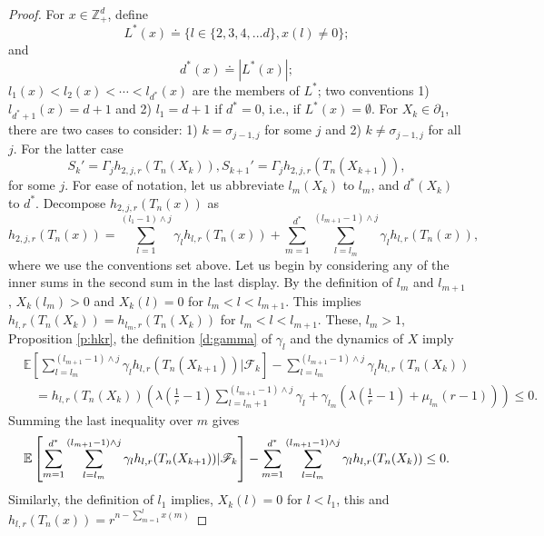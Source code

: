 \documentclass[11pt,a4paper]{article}
\begin{document}
\begin{proof}
For $x \in {\mathbb Z}_+^d$, define
\[
L^*(x) \doteq \{ l \in \{2,3,4,...d\}, x(l) \neq 0 \};
\]
and 
\[
d^*(x) \doteq |L^*(x)|;
\]
$l_1(x) < l_2(x) < \cdots < l_{d^*}(x)$ are the members of $L^*$; two
conventions 1)
$l_{d^*+1}(x) = d+1$ and 2) $l_1 = d+1$
 if $d^* = 0$, i.e., if $L^*(x) = \emptyset.$
For $X_k \in \partial_1$, 
there are two cases to consider: 1) $k = \sigma_{j-1,j}$
for some $j$ and 2)  $k \neq \sigma_{j-1,j}$ for all $j$.
For the latter case 
\begin{equation}\label{e:skpp1}
S_k' = \Gamma_j h_{2,j,r}(T_n(X_k)),
S_{k+1}' = \Gamma_j h_{2,j,r}(T_n(X_{k+1})),
\end{equation}
for some $j$.
For ease of notation, let us abbreviate $l_m(X_{k})$ to $l_m$, 
and $d^*(X_{k})$ to $d^*$.
Decompose
$h_{2,j,r}(T_n(x))$ as
\begin{equation}\label{e:decomposeh2jr}
h_{2,j,r}(T_n(x)) = 
\sum_{l=1}^{(l_1-1) \wedge j}\gamma_l h_{l,r}(T_n(x)) 
+ \sum_{m=1}^{d^*} \sum_{l=l_m}^{(l_{m+1} -1)\wedge j} \gamma_l h_{l,r}(T_n(x)),
\end{equation}
where we use the conventions set above.
Let us begin by considering any of the inner sums in the
second sum in the last display. By the definition
of $l_m$ and $l_{m+1}$, $X_k(l_m) > 0$ and
$X_k(l) = 0$ for $l_m < l < l_{m+1}$. This implies
$h_{l,r}(T_n(X_k))  = h_{l_m,r}(T_n(X_k))$ 
for $l_m < l < l_{m+1}$. These, $l_m > 1$, Proposition \ref{p:hkr},
the definition \eqref{d:gamma} of $\gamma_l$ and the dynamics of $X$ imply
\begin{align*}
&{\mathbb E}
\left
[\sum_{l=l_m}^{(l_{m+1} -1)\wedge j} \gamma_l h_{l,r}(T_n(X_{k+1}))
| {\mathscr F}_k \right] -
\sum_{l=l_m}^{(l_{m+1} -1)\wedge j} \gamma_l h_{l,r}(T_n(X_k))\\
&~~~~=
h_{l,r}(T_n(X_k))
\left(
\lambda \left( \frac{1}{r} - 1 \right)
\sum_{l=l_m+1}^{(l_{m+1} -1)\wedge j} \gamma_l 
+ \gamma_{l_m} \left( \lambda\left(\frac{1}{r} -1\right) 
+ \mu_{l_m}(r-1) \right)\right)
\le 0.
\end{align*}
Summing the last inequality over $m$ gives
\begin{equation}\label{e:therestSkp}
{\mathbb E}
\left
[\sum_{m=1}^{d^*}\sum_{l=l_m}^{(l_{m+1} -1)\wedge j} \gamma_l h_{l,r}(T_n(X_{k+1}))
| {\mathscr F}_k \right] -
\sum_{m=1}^{d^*}\sum_{l=l_m}^{(l_{m+1} -1)\wedge j} \gamma_l h_{l,r}(T_n(X_k))\\
\le 0.
\end{equation}
Similarly, the definition of $l_1$ implies, $X_k(l) = 0$ for $l< l_1$,
this and $h_{l,r}(T_n(x)) = r^{n-\sum_{m=1}^l x(m)}$

\end{proof}
\end{document}
